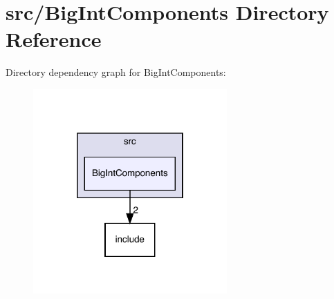 \section{src/\+Big\+Int\+Components Directory Reference}
\label{dir_a7443175d3953913c0021812f22d6904}
Directory dependency graph for Big\+Int\+Components\+:\nopagebreak
\begin{figure}[H]
\begin{center}
\leavevmode
\includegraphics[width=210pt]{dir_a7443175d3953913c0021812f22d6904_dep}
\end{center}
\end{figure}
